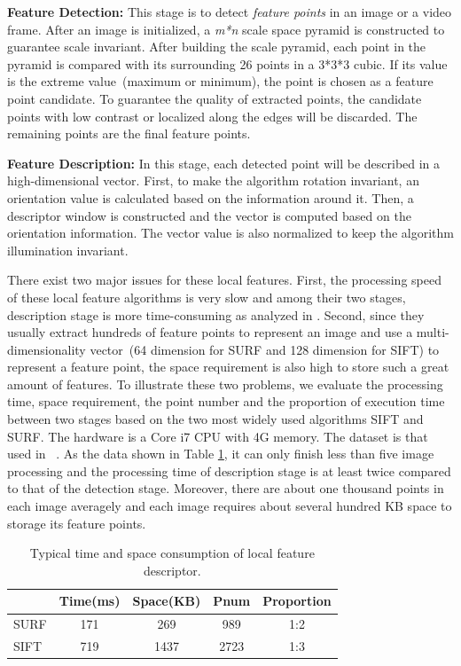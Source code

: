 \squishlist
\setlength{\itemsep}{0mm}

\item \textbf{Feature Detection:} This stage is to detect \emph{feature points} in an image or a video frame. After an image is initialized, a \emph{m*n} scale space pyramid is constructed to guarantee scale invariant.  After building the scale pyramid, each point in the pyramid is compared with its surrounding 26 points in a 3*3*3 cubic. If its value is the extreme value~(maximum or minimum), the point is chosen as a feature point candidate. To guarantee the quality of extracted points, the candidate points with low contrast or localized along the edges will be discarded. The remaining points are the final feature points.

\item \textbf{Feature Description:} In this stage, each detected point will be described in a high-dimensional vector. First, to make the algorithm rotation invariant, an orientation value is calculated based on the information around it. Then, a descriptor window is constructed and the vector is computed based on the orientation information. The vector value is also normalized to keep the algorithm illumination invariant.
\squishend

There exist two major issues for these local features. First, the processing speed of these local feature algorithms is very slow and among their two stages, description stage is more time-consuming as analyzed in \cite{adaptivepipelineicpp2012}. Second, since they usually extract hundreds of feature points to represent an image and use a multi-dimensionality vector~(64 dimension for SURF and 128 dimension for SIFT) to represent a feature point, the space requirement is also high to store such a great amount of features. To illustrate these two problems, we evaluate the processing time, space requirement, the point number and the proportion of execution time between two stages based on the two most widely used algorithms SIFT and SURF. The hardware is a Core i7 CPU with 4G memory. The dataset is that used in ~\cite{mikolajczyk2005performance}. As the data shown in Table \ref{tab:surfandsift}, it can only finish less than five image processing and the processing time of description stage is at least twice compared to that of the detection stage. Moreover, there are about one thousand points in each image averagely and each image requires about several hundred KB space to storage its feature points.

\begin{table}[!ht]
\begin{center}
\begin{tabular}{|l|c|c|c|c|}
\hline
 & Time(ms) & Space(KB) & Pnum & Proportion \\
\hline
SURF & 171 & 269 & 989   &  1:2\\\hline
SIFT & 719 & 1437 & 2723 & 1:3 \\\hline
\end{tabular}
\end{center}
\caption{Typical time and space consumption of local feature descriptor.}
\label{tab:surfandsift}
\end{table}

